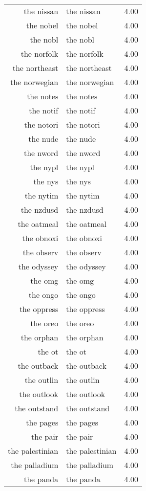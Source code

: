 \begin{table}[ht]
\begin{tabular}{rlr}
  the nissan & the nissan & 4.00 \\ 
  the nobel & the nobel & 4.00 \\ 
  the nobl & the nobl & 4.00 \\ 
  the norfolk & the norfolk & 4.00 \\ 
  the northeast & the northeast & 4.00 \\ 
  the norwegian & the norwegian & 4.00 \\ 
  the notes & the notes & 4.00 \\ 
  the notif & the notif & 4.00 \\ 
  the notori & the notori & 4.00 \\ 
  the nude & the nude & 4.00 \\ 
  the nword & the nword & 4.00 \\ 
  the nypl & the nypl & 4.00 \\ 
  the nys & the nys & 4.00 \\ 
  the nytim & the nytim & 4.00 \\ 
  the nzdusd & the nzdusd & 4.00 \\ 
  the oatmeal & the oatmeal & 4.00 \\ 
  the obnoxi & the obnoxi & 4.00 \\ 
  the observ & the observ & 4.00 \\ 
  the odyssey & the odyssey & 4.00 \\ 
  the omg & the omg & 4.00 \\ 
  the ongo & the ongo & 4.00 \\ 
  the oppress & the oppress & 4.00 \\ 
  the oreo & the oreo & 4.00 \\ 
  the orphan & the orphan & 4.00 \\ 
  the ot & the ot & 4.00 \\ 
  the outback & the outback & 4.00 \\ 
  the outlin & the outlin & 4.00 \\ 
  the outlook & the outlook & 4.00 \\ 
  the outstand & the outstand & 4.00 \\ 
  the pages & the pages & 4.00 \\ 
  the pair & the pair & 4.00 \\ 
  the palestinian & the palestinian & 4.00 \\ 
  the palladium & the palladium & 4.00 \\ 
  the panda & the panda & 4.00 \\ 

\end{tabular}
\end{table}
